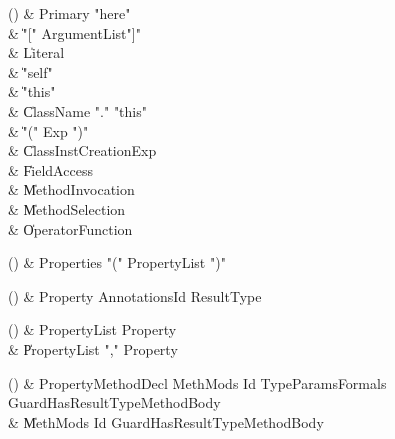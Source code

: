 \begin{bbgrammarappendix}

() & Primary \label{prod:Primary}  \: \xcd"here"  \\

 &    \| \xcd"[" ArgumentList\opt \xcd"]" \\
 &    \| Literal \\
 &    \| \xcd"self" \\
 &    \| \xcd"this" \\
 &    \| ClassName \xcd"." \xcd"this" \\
 &    \| \xcd"(" Exp \xcd")" \\
 &    \| ClassInstCreationExp \\
 &    \| FieldAccess \\
 &    \| MethodInvocation \\
 &    \| MethodSelection \\
 &    \| OperatorFunction \\

\end{bbgrammarappendix}

\begin{bbgrammarappendix}

() & Properties \label{prod:Properties}  \: \xcd"(" PropertyList \xcd")"  \\


\end{bbgrammarappendix}

\begin{bbgrammarappendix}

() & Property \label{prod:Property}  \: Annotations\opt Id ResultType  \\


\end{bbgrammarappendix}

\begin{bbgrammarappendix}

() & PropertyList \label{prod:PropertyList}  \: Property  \\

 &    \| PropertyList \xcd"," Property \\

\end{bbgrammarappendix}

\begin{bbgrammarappendix}

() & PropertyMethodDecl \label{prod:PropertyMethodDecl}  \: MethMods Id TypeParams\opt Formals Guard\opt HasResultType\opt MethodBody  \\

 &    \| MethMods Id Guard\opt HasResultType\opt MethodBody \\

\end{bbgrammarappendix}

